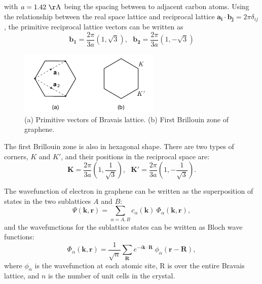 \documentclass[pdflatex, sectionletters, 12pt]{pittetd}    %
\begin{document}
with $a = 1.42 \ \mathrm{\AA}$ being the spacing between to adjacent carbon atoms. Using the relationship between the real space lattice and reciprocal lattice $\mathbf{a_i}\cdot\mathbf{b_j} = 2\pi\delta_{ij}$, the primitive reciprocal lattice vectors can be written as 
$$\mathbf{b_1} = \frac{2\pi}{3a}\left(1, \sqrt{3}\right), \ \ \ \mathbf{b_2} = \frac{2\pi}{3a}\left(1, -\sqrt{3}\right)$$

\begin{figure}[h!]
	\centering
	\includegraphics[width=0.6\textwidth]{Drawing/Bravais.pdf}
	\caption{(a) Primitive vectors of Bravais lattice. (b) First Brillouin zone of graphene.}
	\label{FIG:Bravais}
\end{figure}

The first Brillouin zone is also in hexagonal shape. There are two types of corners, $K$ and $K'$, and their positions in the reciprocal space are:
$$\mathbf{K} = \frac{2\pi}{3a}\left(1, \frac{1}{\sqrt{3}}\right), \ \ \ \mathbf{K'} =  \frac{2\pi}{3a}\left(1, -\frac{1}{\sqrt{3}}\right).$$

The wavefunction of electron in graphene can be written as the superposition of states in the two sublattices $A$ and $B$:
$$\Psi(\mathbf{k}, \mathbf{r}) = \sum_{\alpha = A, B}c_{\alpha}(\mathbf{k}) \ \Phi_{\alpha}(\mathbf{k}, \mathbf{r}),$$
and the wavefunctions for the sublattice states can be written as Bloch wave functions:
$$\Phi_{\alpha}(\mathbf{k}, \mathbf{r}) = \frac{1}{\sqrt{n}}\sum_\mathbf{R} e^{-i \mathbf{k} \cdot \mathbf{R}} \ \phi_{\alpha}(\mathbf{r} - \mathbf{R}),$$
where $\phi_{\alpha}$ is the wavefunction at each atomic site, R is over the entire Bravais lattice, and $n$ is the number of unit cells in the crystal. 
\end{document}
